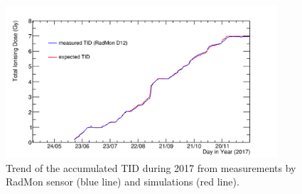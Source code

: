 \begin{figure}[H]
\begin{center}
\includegraphics[width=0.9\textwidth]{figures/SensorSimulation/radmon2017.png}	
\end{center}
\caption{Trend of the accumulated TID during 2017 from measurements by RadMon sensor (blue line) and simulations (red line). }
\label{radmon1} 
\end{figure}

